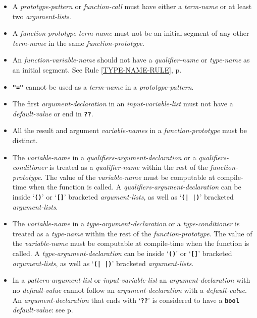 \documentclass[12pt]{article}
\newcommand{\TT}[1]{{\tt \bfseries #1}}
\newcommand{\pagref}[1]{p\pageref{#1}}
\newenvironment{indpar}[1][0.3in]%
	{\begin{list}{}%
		     {\setlength{\itemsep}{0in}%
		      \setlength{\topsep}{0in}%
		      \setlength{\parsep}{1ex}%
		      \setlength{\labelwidth}{#1}%
		      \setlength{\leftmargin}{#1}%
		      \addtolength{\leftmargin}{\labelsep}}%
	 \item}%
	{\end{list}}
\begin{document}
\begin{indpar}
\begin{itemize}
\item
A {\em prototype-pattern} or {\em function-call}
must have either a {\em term-name}
or at least two {\em argu\-ment-lists}.
\item
A {\em function-prototype} {\em term-name} must not be
an initial segment of any other {\em term-name}
in the same {\em function-prototype}.
\item
An {\em function-variable-name}
should not have a {\em qualifier-name} or {\em type-name} as an initial segment.
See Rule \ref{TYPE-NAME-RULE}, \pagref{TYPE-NAME-RULE}.
\item
\TT{"="} cannot be used as a {\em term-name}
in a {\em prototype-pattern}.
\item
The first {\em argument-declaration} in an {\em input-variable-list}
must not have a {\em default-value} or end in \TT{??}.
\item
All the result and argument {\em variable-names}
in a {\em function-prototype} must
be distinct.
\item
The {\em variable-name} in a {\em qualifiers-argument-declaration}
or a {\em qualifiers-conditioner} is treated as a {\em qualifier-name}
within the rest of the {\em function-prototype}.  The value of the
{\em variable-name} must be computable at compile-time when the
function is called.  A {\em qualifiers-argument-declaration}
can be inside `\TT{()}' or `\TT{[]}' bracketed {\em argument-lists},
as well as `\TT{(|~|)}' bracketed {\em argument-lists}.
\item
The {\em variable-name} in a {\em type-argument-declaration}
or a {\em type-conditioner} is treated as a {\em type-name}
within the rest of the {\em function-prototype}.  The value of the
{\em variable-name} must be computable at compile-time when the
function is called.  A {\em type-argument-declaration}
can be inside `\TT{()}' or `\TT{[]}' bracketed {\em argument-lists},
as well as `\TT{(|~|)}' bracketed {\em argument-lists}.
\item
In a {\em pattern-argument-list} or {\em input-variable-list}
an {\em argument-declaration} with no {\em de\-fault-value} cannot
follow an {\em argument-declaration} with a {\em default-value}.
An {\em argument-declaration} that ends with `\TT{??}' is considered
to have a \TT{bool} {\em default-value}: see \pagref{BOOL-DEFAULT}.


\end{itemize}
\end{indpar}
\end{document}
